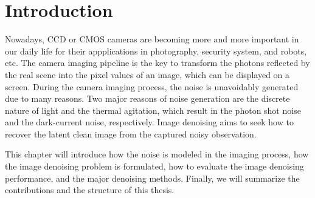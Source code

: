 %

\chapter{Introduction}
\label{sec:intro}

Nowadays, CCD or CMOS cameras are becoming more and more important in our daily life for their appplications in photography, security system, and robots, etc. The camera imaging pipeline is the key to transform the photons reflected by the real scene into the pixel values of an image, which can be displayed on a screen. During the camera imaging process, the noise is unavoidably generated due to many reasons. Two major reasons of noise generation are the discrete nature of light and the thermal agitation, which result in the photon shot noise and the dark-current noise, respectively. Image denoising aims to seek how to recover the latent clean image from the captured noisy observation. 

This chapter will introduce how the noise is modeled in the imaging process, how the image denoising problem is formulated, how to evaluate the image denoising performance, and the major denoising methods. Finally, we will summarize the contributions and the structure of this thesis.



